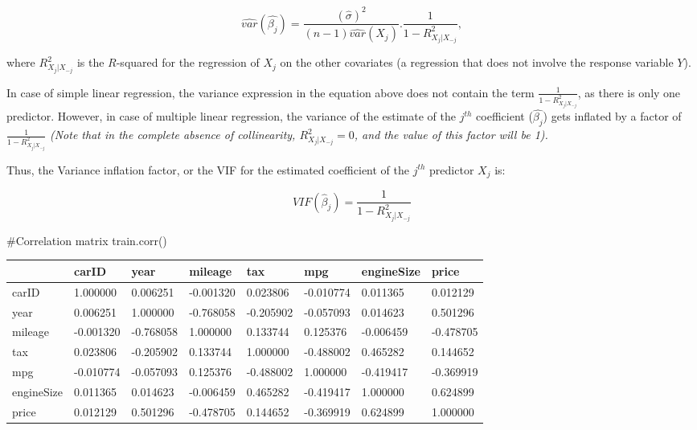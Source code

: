 \documentclass[
  letterpaper,
  DIV=11,
  numbers=noendperiod]{scrreprt}
\newenvironment{Shaded}{\begin{snugshade}}{\end{snugshade}}
\newcommand{\CommentTok}[1]{\textcolor[rgb]{0.37,0.37,0.37}{#1}}
\newcommand{\NormalTok}[1]{\textcolor[rgb]{0.00,0.23,0.31}{#1}}
\begin{document}
\[\hat{var}(\hat{\beta_j}) = \frac{(\hat{\sigma})^2}{(n-1)\hat{var}({X_j})}.\frac{1}{1-R^2_{X_j|X_{-j}}},\]

where \(R^2_{X_j|X_{-j}}\) is the \(R\)-squared for the regression of
\(X_j\) on the other covariates (a regression that does not involve the
response variable \(Y\)).

In case of simple linear regression, the variance expression in the
equation above does not contain the term
\(\frac{1}{1-R^2_{X_j|X_{-j}}}\), as there is only one predictor.
However, in case of multiple linear regression, the variance of the
estimate of the \(j^{th}\) coefficient (\(\hat{\beta_j}\)) gets inflated
by a factor of \(\frac{1}{1-R^2_{X_j|X_{-j}}}\) \emph{(Note that in the
complete absence of collinearity, \(R^2_{X_j|X_{-j}}=0\), and the value
of this factor will be 1).}

Thus, the Variance inflation factor, or the VIF for the estimated
coefficient of the \(j^{th}\) predictor \(X_j\) is:

\begin{equation}
VIF(\hat \beta_j) = \frac{1}{1-R^2_{X_j|X_{-j}}}
\end{equation}

\begin{Shaded}
\begin{Highlighting}[]
\CommentTok{\#Correlation matrix}
\NormalTok{train.corr()}
\end{Highlighting}
\end{Shaded}

\begin{longtable}[]{@{}llllllll@{}}
\toprule\noalign{}
& carID & year & mileage & tax & mpg & engineSize & price \\
\midrule\noalign{}
\endhead
\bottomrule\noalign{}
\endlastfoot
carID & 1.000000 & 0.006251 & -0.001320 & 0.023806 & -0.010774 &
0.011365 & 0.012129 \\
year & 0.006251 & 1.000000 & -0.768058 & -0.205902 & -0.057093 &
0.014623 & 0.501296 \\
mileage & -0.001320 & -0.768058 & 1.000000 & 0.133744 & 0.125376 &
-0.006459 & -0.478705 \\
tax & 0.023806 & -0.205902 & 0.133744 & 1.000000 & -0.488002 & 0.465282
& 0.144652 \\
mpg & -0.010774 & -0.057093 & 0.125376 & -0.488002 & 1.000000 &
-0.419417 & -0.369919 \\
engineSize & 0.011365 & 0.014623 & -0.006459 & 0.465282 & -0.419417 &
1.000000 & 0.624899 \\
price & 0.012129 & 0.501296 & -0.478705 & 0.144652 & -0.369919 &
0.624899 & 1.000000 \\
\end{longtable}
\end{document}
